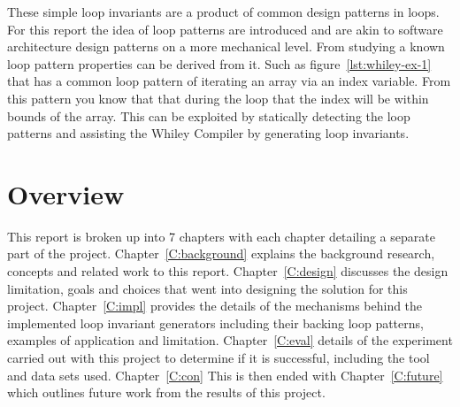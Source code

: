 These simple loop invariants are a product of common design patterns in loops.
For this report the idea of loop patterns are introduced and are akin to
software architecture design patterns on a more mechanical level.
From studying a known loop pattern properties can be derived from it.
Such as figure~\ref{lst:whiley-ex-1} that has a common loop pattern of
iterating an array via an index variable.
From this pattern you know that that during the loop that the index will be
within bounds of the array.
This can be exploited by statically detecting the loop patterns and assisting
the Whiley Compiler by generating loop invariants.

\section{Overview}

This report is broken up into 7 chapters with each chapter detailing a separate part of the project.
Chapter~\ref{C:background} explains the background research, concepts and related work to this report.
Chapter~\ref{C:design} discusses the design limitation, goals and choices that went into designing the
solution for this project.
Chapter~\ref{C:impl} provides the details of the mechanisms behind the implemented 
loop invariant generators including their backing loop patterns, examples of application and limitation.
Chapter~\ref{C:eval} details of the experiment carried out with this project to determine if it is
successful, including the tool and data sets used. 
Chapter~\ref{C:con} 
This is then ended with Chapter~\ref{C:future} which outlines future work from the results of this project.
